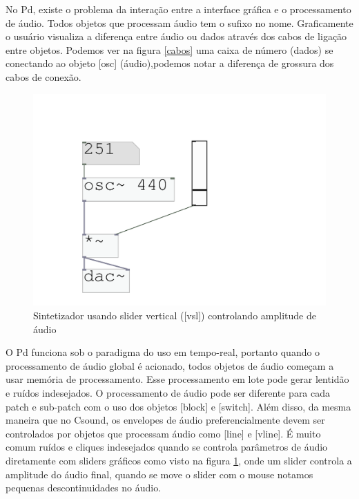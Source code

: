 \documentclass{ppgmus}
\begin{document}
No Pd, existe o problema da interação entre a interface gráfica e 
o processamento de áudio. Todos objetos que processam áudio tem o sufixo \texttildelow no
nome. Graficamente o usuário visualiza a diferença
entre áudio ou dados através dos cabos de ligação entre objetos. Podemos
ver na figura \ref{cabos} uma caixa de número (dados) se conectando ao objeto [osc\texttildelow]
(áudio),podemos notar a diferença de grossura dos cabos de conexão.

\begin{figure}
\includegraphics[scale=.6]{line}
\caption{Sintetizador usando slider vertical ([vsl]) controlando amplitude de áudio}
\label{line}
\end{figure}


O Pd funciona sob o paradigma do uso em tempo-real,
portanto quando o processamento de áudio global é acionado, 
todos objetos de áudio começam a usar memória de processamento.
Esse processamento em lote pode gerar lentidão e ruídos indesejados.
O processamento de áudio pode ser diferente para
cada patch e sub-patch com o uso dos objetos [block\texttildelow] e
[switch\texttildelow]. Além disso, da mesma maneira que no Csound, os
envelopes de áudio preferencialmente devem ser controlados
por objetos que processam áudio como [line\texttildelow] e [vline\texttildelow].
É muito comum ruídos e cliques indesejados quando se controla parâmetros
de áudio diretamente com sliders gráficos como visto na figura \ref{line}, onde 
um slider controla a amplitude do áudio final, quando se move o slider com o mouse
notamos pequenas descontinuidades no áudio. 
\end{document}
